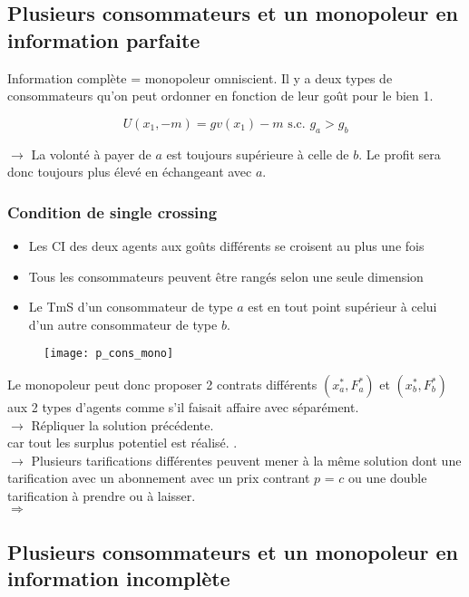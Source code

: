 \subsection{Plusieurs consommateurs et un monopoleur en information parfaite}

Information complète = monopoleur omniscient.
Il y a deux types de consommateurs qu'on peut ordonner en fonction de leur goût pour le bien 1.

\begin{equation*}
U(x_1, -m) = g v(x_1) - m \text{ s.c. } g_a > g_b
\end{equation*}

$\rightarrow$ La volonté à payer de $a$ est toujours supérieure à celle de $b$. Le profit sera donc toujours plus élevé en échangeant avec $a$.

\subsubsection{Condition de single crossing}
\begin{itemize}
\item Les CI des deux agents aux goûts différents se croisent au plus une fois
\item Tous les consommateurs peuvent être rangés selon une seule dimension
\item Le TmS d'un consommateur de type $a$ est en tout point supérieur à celui d'un autre consommateur de type $b$.
\end{itemize}
\begin{figure}[H]
	\centering
	\texttt{[image: p\_cons\_mono]}
\end{figure}
Le monopoleur peut donc proposer 2 contrats différents $(x^*_a, F^*_a)$ et $(x^*_b, F^*_b)$ aux 2 types d'agents comme s'il faisait affaire avec séparément.\\
$\rightarrow$ Répliquer la solution précédente.\\
 car tout les surplus potentiel est réalisé. .\\
$\rightarrow$ Plusieurs tarifications différentes peuvent mener à la même solution dont une tarification avec un abonnement avec un prix contrant $p$ = $c$ ou une double tarification à prendre ou à laisser.\\
$\Rightarrow$ 

\subsection{Plusieurs consommateurs et un monopoleur en information incomplète}

